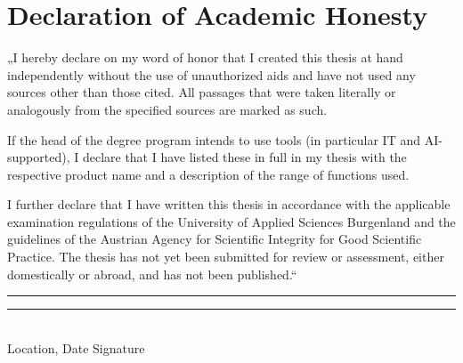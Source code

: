 {}
\chapter*{Declaration of Academic Honesty}

„I hereby declare on my word of honor that I created this thesis at hand independently without the use of unauthorized aids and have not used any sources other than those cited. All passages that were taken literally or analogously from the specified sources are marked as such.

\noindent

If the head of the degree program intends to use tools (in particular IT and AI-supported), I declare that I have listed these in full in my thesis with the respective product name and a description of the range of functions used.

\noindent

I further declare that I have written this thesis in accordance with the applicable examination regulations of the University of Applied Sciences Burgenland and the guidelines of the Austrian Agency for Scientific Integrity for Good Scientific Practice. The thesis has not yet been submitted for review or assessment, either domestically or abroad, and has not been published.“

\vspace{3cm}

\noindent

\rule[1em]{15em}{0.5pt}  \hfill \rule[1em]{15em}{0.5pt}\\ %
Location, Date \hfill Signature\\

